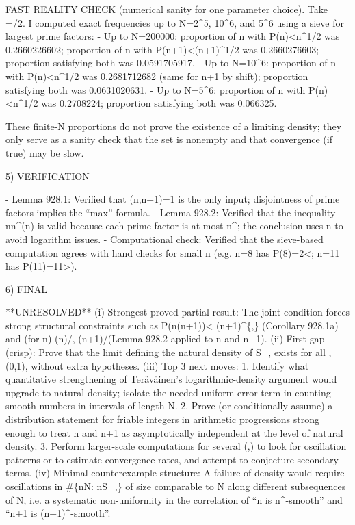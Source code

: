 FAST REALITY CHECK (numerical sanity for one parameter choice).
Take \alpha=/2.
I computed exact frequencies up to N=2^5, 10^6, and 5^6 using a sieve for largest prime factors:
- Up to N=200000:
  proportion of n with P(n)<n^{1/2} was 0.2660226602;
  proportion of n with P(n+1)<(n+1)^{1/2} was 0.2660276603;
  proportion satisfying both was 0.0591705917.
- Up to N=10^6:
  proportion of n with P(n)<n^{1/2} was 0.2681712682 (same for n+1 by shift);
  proportion satisfying both was 0.0631020631.
- Up to N=5^6:
  proportion of n with P(n)<n^{1/2} was 0.2708224;
  proportion satisfying both was 0.066325.

These finite-N proportions do not prove the existence of a limiting density; they only serve as a sanity check that the set is nonempty and that convergence (if true) may be slow.


5) VERIFICATION

- Lemma 928.1: Verified that \gcd(n,n+1)=1 is the only input; disjointness of prime factors implies the “max” formula.
- Lemma 928.2: Verified that the inequality n\le n^{\alpha\Omega(n)} is valid because each prime factor is at most n^{\alpha}; the conclusion uses n to avoid logarithm issues.
- Computational check: Verified that the sieve-based computation agrees with hand checks for small n (e.g. n=8 has P(8)=2<; n=11 has P(11)=11>).


6) FINAL

**UNRESOLVED**
(i) Strongest proved partial result: The joint condition forces strong structural constraints such as P(n(n+1))< (n+1)^{\max\{\alpha,\beta\}} (Corollary 928.1a) and (for n) \Omega(n)\ge {}/\alpha\rceil, \Omega(n+1)\ge {}/\beta\rceil (Lemma 928.2 applied to n and n+1).
(ii) First gap (crisp): Prove that the limit defining the natural density of S_{\alpha,\beta} exists for all \alpha,\beta\in(0,1), without extra hypotheses.
(iii) Top 3 next moves:
  1. Identify what quantitative strengthening of Ter\"{a}v\"{a}inen’s logarithmic-density argument would upgrade to natural density; isolate the needed uniform error term in counting smooth numbers in intervals of length \asymp N.
  2. Prove (or conditionally assume) a distribution statement for friable integers in arithmetic progressions strong enough to treat n and n+1 as asymptotically independent at the level of natural density.
  3. Perform larger-scale computations for several (\alpha,\beta) to look for oscillation patterns or to estimate convergence rates, and attempt to conjecture secondary terms.
(iv) Minimal counterexample structure: A failure of density would require oscillations in \#\{n\le N: n\in S_{\alpha,\beta}\} of size comparable to N along different subsequences of N, i.e. a systematic non-uniformity in the correlation of “n is n^\alpha-smooth” and “n+1 is (n+1)^\beta-smooth”.





